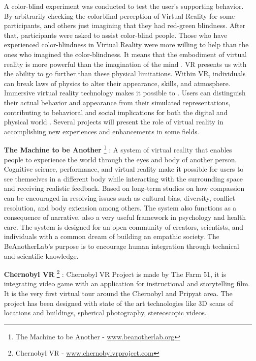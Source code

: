  A color-blind experiment was conducted to test the user's supporting behavior. By arbitrarily checking the colorblind perception of Virtual Reality for some participants, and others just imagining that they had red-green blindness. After that, participants were asked to assist color-blind people. Those who have experienced color-blindness in Virtual Reality were more willing to help than the ones who imagined the color-blindness. It means that the embodiment of virtual reality is more powerful than the imagination of the mind \citep{Shriram2017VirtualBehavior}. VR presents us with the ability to go further than these physical limitations. Within VR, individuals can break laws of physics to alter their appearance, skills, and atmosphere. Immersive virtual reality technology makes it possible to . Users can distinguish their actual behavior and appearance from their simulated representations, contributing to behavioral and social implications for both the digital and physical world \citep{Shriram2017VirtualBehavior}.
Several projects will present the role of virtual reality in accomplishing new experiences and enhancements in some fields.

\textbf{The Machine to be Another} \footnote{The Machine to be Another - \url{www.beanotherlab.org}} : A system of virtual reality that enables people to experience the world through the eyes and body of another person. Cognitive science, performance, and virtual reality make it possible for users to see themselves in a different body while interacting with the surrounding space and receiving realistic feedback. Based on long-term studies on how compassion can be encouraged in resolving issues such as cultural bias, diversity, conflict resolution, and body extension among others. The system also functions as a consequence of narrative, also a very useful framework in psychology and health care.
The system is designed for an open community of creators, scientists, and individuals with a common dream of building an empathic society. The BeAnotherLab's purpose is to encourage human integration through technical and scientific knowledge.

\textbf{Chernobyl VR} \footnote{Chernobyl VR - \url{www.chernobylvrproject.com}} : Chernobyl VR Project is made by The Farm 51,  it is integrating video game with an application for instructional and storytelling film. It is the very first virtual tour around the Chernobyl and Pripyat area. The project has been designed with state of the art technologies like 3D scans of locations and buildings, spherical photography, stereoscopic videos. 


